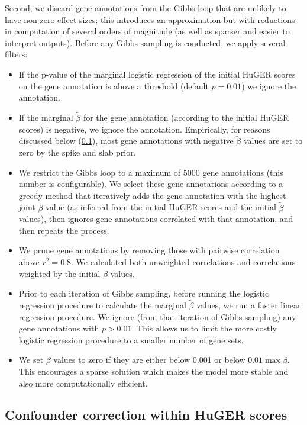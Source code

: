 \documentclass[11pt]{article}
\begin{document}
{Second, we discard gene annotations from the Gibbs loop that are
unlikely to have non-zero effect sizes; this introduces an
approximation but with reductions in computation of several orders of
magnitude (as well as sparser and easier to interpret outputs). Before
any Gibbs sampling is conducted, we apply several filters:
\begin{itemize}
  \item If the p-value of the marginal logistic regression of the
    initial HuGER scores on the gene annotation is above a threshold
    (default $p=0.01$) we ignore the annotation.
  \item If the marginal $\tilde{\beta}$ for the gene annotation
    (according to the initial HuGER scores) is negative, we ignore the
    annotation. Empirically, for reasons discussed below (\ref{}),
    most gene annotations with negative $\tilde{\beta}$ values are set
    to zero by the spike and slab prior.
  \item We restrict the Gibbs loop to a maximum of $5000$ gene
    annotations (this number is configurable). We select these gene
    annotations according to a greedy method that iteratively adds the
    gene annotation with the highest joint $\beta$ value (as inferred from
    the initial HuGER scores and the initial $\tilde{\beta}$ values),
    then ignores gene annotations correlated with that annotation, and
    then repeats the process.
  \item We prune gene annotations by removing those with pairwise
    correlation above $r^2=0.8$. We calculated both unweighted
    correlations and correlations weighted by the initial $\beta$
    values.
  \item Prior to each iteration of Gibbs sampling, before running the
    logistic regression procedure to calculate the marginal
    $\tilde{\beta}$ values, we run a faster linear regression
    procedure. We ignore (from that iteration of Gibbs sampling) any
    gene annotations with $p>0.01$. This allows us to limit the more
    costly logistic regression procedure to a smaller number of gene sets.
  \item We set $\beta$ values to zero if they are either below 0.001 or
below $0.01\max{\beta}$. This encourages a sparse solution which makes
the model more stable and also more computationally efficient.

\end{itemize}

\subsection{Confounder correction within HuGER scores}

}
\end{document}
